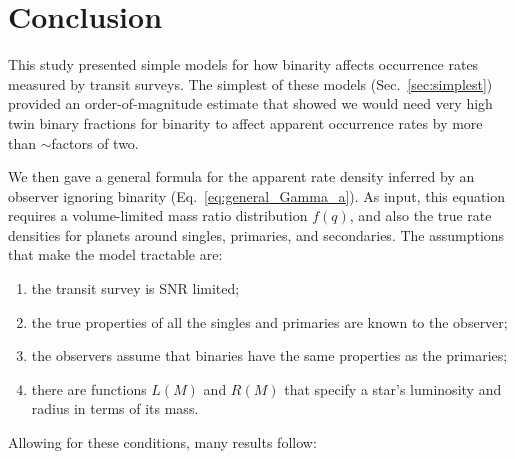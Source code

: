 \documentclass[12pt,modern]{aastex61}
\begin{document}
%

\section{Conclusion}
\label{sec:conclusion}

This study presented simple models for how binarity affects occurrence 
rates measured by transit surveys.
The simplest of these models (Sec.~\ref{sec:simplest}) provided an 
order-of-magnitude estimate that showed we would need very high twin binary 
fractions for binarity to affect apparent occurrence rates by more than 
$\sim$factors of two.

We then gave a general formula for the apparent rate density inferred by an 
observer ignoring binarity (Eq.~\ref{eq:general_Gamma_a}).
As input, this equation requires a volume-limited mass ratio distribution 
$f(q)$, and also the true rate densities for planets around singles, 
primaries, and secondaries.
The assumptions that make the model tractable are:
\begin{enumerate}
    \item the transit survey is SNR limited;
    \item the true properties of all the singles and primaries are known to 
    the observer;
    \item the observers assume that binaries have the same properties as the 
    primaries;
    \item there are functions $L(M)$ and $R(M)$ that specify a star's 
    luminosity and radius in terms of its mass.
\end{enumerate}
Allowing for these conditions, many results follow:
\end{document}
